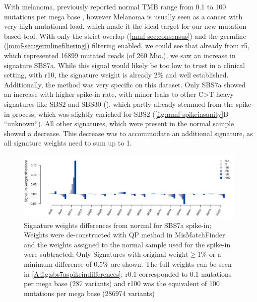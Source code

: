 With melanoma, previously reported normal TMB range from 0.1 to 100 mutations per mega base \cite{Alexandrov2020}, however Melanoma is usually seen as a cancer with very high mutational load, which made it the ideal target for our new mutation based tool. With only the strict overlap (\autoref{mmf-sec:consensus}) and the germline (\autoref{mmf-sec:germlinefiltering}) filtering enabled, we could see that already from r5, which represented 16899 mutated reads (of 260 Mio.), we saw an increase in signature SBS7a. While this signal would likely be too low to trust in a clinical setting, with r10, the signature weight is already 2\% and well established. Additionally, the method was very specific on this dataset. Only SBS7a showed an increase with higher spike-in rate, with minor leaks to other C>T heavy signatures like SBS2 and SBS30 (), which partly already stemmed from the spike-in process, which was slightly enriched for SBS2 (\autoref{fig:mmf-spikeinsanity}B ``unknown``). All other signatures, which were present in the normal sample showed a decrease. This decrease was to accommodate an additional signature, as all signature weights need to sum up to 1.


\begin{figure}[ht]
\centering
\includegraphics[width=.99\linewidth]{Figures/MisMatchFinder/SBS7SpikeInSignatureDifferencesFocussed.pdf}
\caption[Signature weights differences from normal for SBS7a spike-in]{Signature weights differences from normal for SBS7a spike-in; Weights were de-constructed with QP method in MisMatchFinder and the weights assigned to the normal sample used for the spike-in were subtracted; Only Signatures with $\text{original weight}\geq 1\%$ or a minimum difference of 0.5\% are shown. The full weights can be seen in \protect\autoref{A:fig:sbs7aspikeindifferences}; r0.1 corresponded to 0.1 mutations per mega base (287 variants) and r100 was the equivalent of 100 mutations per mega base (286974 variants)}\label{fig:mmf-spikeSBS7asignatures}
\end{figure}

